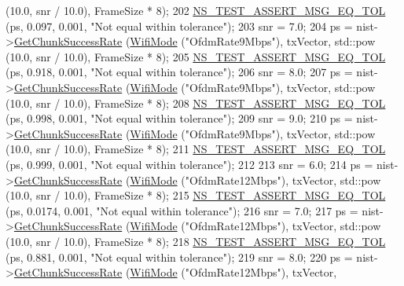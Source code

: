 \begin{DoxyCode}
       (10.0, snr / 10.0), FrameSize * 8);
202   \hyperlink{group__testing_ga9e7861b56b4e70db3b56044cb7a28e41}{NS\_TEST\_ASSERT\_MSG\_EQ\_TOL} (ps, 0.097, 0.001, \textcolor{stringliteral}{"Not equal within tolerance"});
203   snr = 7.0;
204   ps = nist->\hyperlink{classns3_1_1NistErrorRateModel_a2316a2c287485d7cc81198c90b246bc0}{GetChunkSuccessRate} (\hyperlink{classns3_1_1WifiMode}{WifiMode} (\textcolor{stringliteral}{"OfdmRate9Mbps"}), txVector, std::pow
       (10.0, snr / 10.0), FrameSize * 8);
205   \hyperlink{group__testing_ga9e7861b56b4e70db3b56044cb7a28e41}{NS\_TEST\_ASSERT\_MSG\_EQ\_TOL} (ps, 0.918, 0.001, \textcolor{stringliteral}{"Not equal within tolerance"});
206   snr = 8.0;
207   ps = nist->\hyperlink{classns3_1_1NistErrorRateModel_a2316a2c287485d7cc81198c90b246bc0}{GetChunkSuccessRate} (\hyperlink{classns3_1_1WifiMode}{WifiMode} (\textcolor{stringliteral}{"OfdmRate9Mbps"}), txVector, std::pow
       (10.0, snr / 10.0), FrameSize * 8);
208   \hyperlink{group__testing_ga9e7861b56b4e70db3b56044cb7a28e41}{NS\_TEST\_ASSERT\_MSG\_EQ\_TOL} (ps, 0.998, 0.001, \textcolor{stringliteral}{"Not equal within tolerance"});
209   snr = 9.0;
210   ps = nist->\hyperlink{classns3_1_1NistErrorRateModel_a2316a2c287485d7cc81198c90b246bc0}{GetChunkSuccessRate} (\hyperlink{classns3_1_1WifiMode}{WifiMode} (\textcolor{stringliteral}{"OfdmRate9Mbps"}), txVector, std::pow
       (10.0, snr / 10.0), FrameSize * 8);
211   \hyperlink{group__testing_ga9e7861b56b4e70db3b56044cb7a28e41}{NS\_TEST\_ASSERT\_MSG\_EQ\_TOL} (ps, 0.999, 0.001, \textcolor{stringliteral}{"Not equal within tolerance"});
212 
213   snr = 6.0;
214   ps = nist->\hyperlink{classns3_1_1NistErrorRateModel_a2316a2c287485d7cc81198c90b246bc0}{GetChunkSuccessRate} (\hyperlink{classns3_1_1WifiMode}{WifiMode} (\textcolor{stringliteral}{"OfdmRate12Mbps"}), txVector, 
      std::pow (10.0, snr / 10.0), FrameSize * 8);
215   \hyperlink{group__testing_ga9e7861b56b4e70db3b56044cb7a28e41}{NS\_TEST\_ASSERT\_MSG\_EQ\_TOL} (ps, 0.0174, 0.001, \textcolor{stringliteral}{"Not equal within tolerance"});
216   snr = 7.0;
217   ps = nist->\hyperlink{classns3_1_1NistErrorRateModel_a2316a2c287485d7cc81198c90b246bc0}{GetChunkSuccessRate} (\hyperlink{classns3_1_1WifiMode}{WifiMode} (\textcolor{stringliteral}{"OfdmRate12Mbps"}), txVector, 
      std::pow (10.0, snr / 10.0), FrameSize * 8);
218   \hyperlink{group__testing_ga9e7861b56b4e70db3b56044cb7a28e41}{NS\_TEST\_ASSERT\_MSG\_EQ\_TOL} (ps, 0.881, 0.001, \textcolor{stringliteral}{"Not equal within tolerance"});
219   snr = 8.0;
220   ps = nist->\hyperlink{classns3_1_1NistErrorRateModel_a2316a2c287485d7cc81198c90b246bc0}{GetChunkSuccessRate} (\hyperlink{classns3_1_1WifiMode}{WifiMode} (\textcolor{stringliteral}{"OfdmRate12Mbps"}), txVector, 

\end{DoxyCode}
